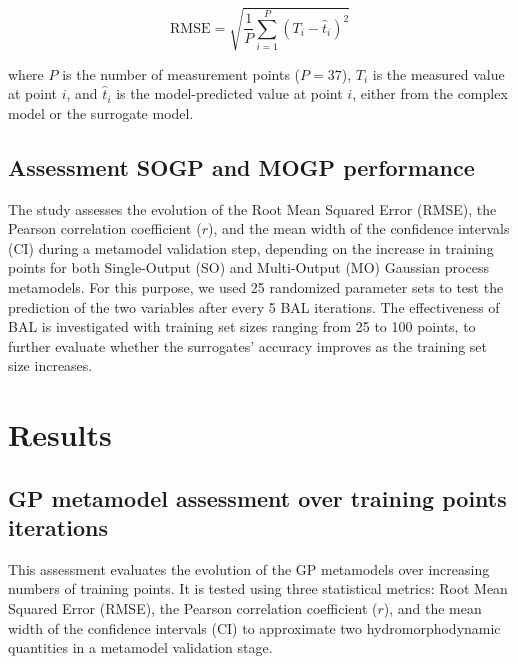 \documentclass[draft,linenumbers,onecolumn]{agujournal2019} %
\begin{document}
\begin{equation}
	\text{RMSE} = \sqrt{ \frac{1}{P} \sum_{i=1}^{P} (T_i - \hat{t}_i)^2 }
\end{equation}

where $P$ is the number of measurement points ($P = 37$), $T_i$ is the measured value at point $i$, and $\hat{t}_i$ is the model-predicted value at point $i$, either from the complex model or the surrogate model.



\subsection{Assessment SOGP and MOGP performance}
\label{sec:sec2.8}
The study assesses the evolution of the Root Mean Squared Error (RMSE), the Pearson correlation coefficient ($r$), and the mean width of the confidence intervals (CI) during a metamodel validation step, depending on the increase in training points for both Single-Output (SO) and Multi-Output (MO) Gaussian process metamodels. For this purpose, we used 25 randomized parameter sets to test the prediction of the two variables after every 5 BAL iterations. The effectiveness of BAL is investigated with training set sizes ranging from 25 to 100 points, to further evaluate whether the surrogates' accuracy improves as the training set size increases.

\section{Results}

\subsection{GP metamodel assessment over training points iterations}

This assessment evaluates the evolution of the GP metamodels over increasing numbers of training points. It is tested using three statistical metrics: Root Mean Squared Error (RMSE), the Pearson correlation coefficient ($r$), and the mean width of the confidence intervals (CI) to approximate two hydromorphodynamic quantities in a metamodel validation stage. 
\end{document}
